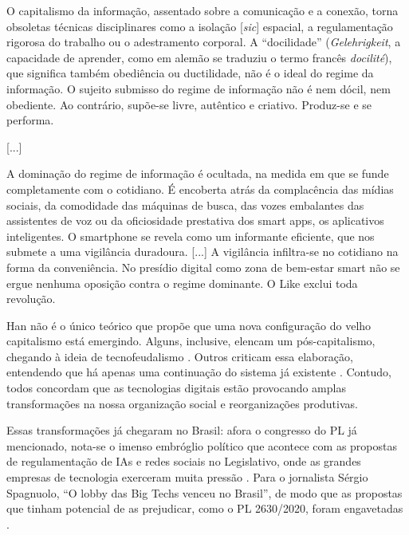 \begin{quoting}
    O capitalismo da informação, assentado sobre a comunicação e a conexão, torna obsoletas técnicas disciplinares como a isolação [\textit{sic}] espacial, a regulamentação rigorosa do trabalho ou o adestramento corporal. 
    A “docilidade” (\textit{Gelehrigkeit}, a capacidade de aprender, como em alemão se traduziu o termo francês \textit{docilité}), que significa também obediência ou ductilidade, não é o ideal do regime da informação. 
    O sujeito submisso do regime de informação não é nem dócil, nem obediente. 
    Ao contrário, supõe-se livre, autêntico e criativo. 
    Produz-se e se performa.
        
    [...]
    
    A dominação do regime de informação é ocultada, na medida em que se funde completamente com o cotidiano. É encoberta atrás da complacência das mídias sociais, da comodidade das máquinas de busca, das vozes embalantes das assistentes de voz ou da oficiosidade prestativa dos smart apps, os aplicativos inteligentes. O smartphone se revela como um informante eficiente, que nos submete a uma vigilância duradoura. [...] A
    vigilância infiltra-se no cotidiano na forma da conveniência. No presídio digital como zona de bem-estar smart não se ergue nenhuma oposição contra o regime dominante. O Like exclui toda revolução. \cite[p.~8-16]{han_infocracia_2022}
\end{quoting}

Han não é o único teórico que propõe que uma nova configuração do velho capitalismo está emergindo.
Alguns, inclusive, elencam um pós-capitalismo, chegando à ideia de tecnofeudalismo \cite{varoufakis_tecnofeudalismo_2023}.
Outros criticam essa elaboração, entendendo que há apenas uma continuação do sistema já existente \cite{morozov_nao_2023}.
Contudo, todos concordam que as tecnologias digitais estão provocando amplas transformações na nossa organização social e reorganizações produtivas.

Essas transformações já chegaram no Brasil: afora o congresso do PL já mencionado, nota-se o imenso embróglio político que acontece com as propostas de regulamentação de IAs e redes sociais no Legislativo, onde as grandes empresas de tecnologia exerceram muita pressão \cite{schurig_como_2024, schurig_quem_2024}.
Para o jornalista Sérgio Spagnuolo, ``O lobby das Big Techs venceu no Brasil'', de modo que as propostas que tinham potencial de as prejudicar, como o PL 2630/2020, foram engavetadas \cite{spagnuolo_lobby_2024}.

